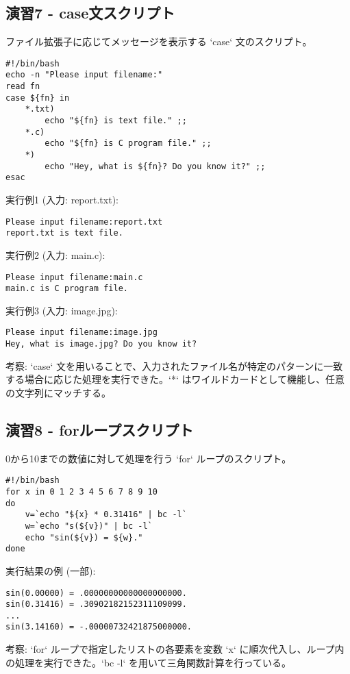\documentclass[a4paper,11pt]{jsarticle}
\begin{document}
\subsection*{演習7 - case文スクリプト}
ファイル拡張子に応じてメッセージを表示する `case` 文のスクリプト。
\begin{lstlisting}[caption=演習7 case文のスクリプト例 (PDF記載例)]
#!/bin/bash
echo -n "Please input filename:"
read fn
case ${fn} in
    *.txt)
        echo "${fn} is text file." ;;
    *.c)
        echo "${fn} is C program file." ;;
    *)
        echo "Hey, what is ${fn}? Do you know it?" ;;
esac
\end{lstlisting}
実行例1 (入力: report.txt):
\begin{verbatim}
Please input filename:report.txt
report.txt is text file.
\end{verbatim}
実行例2 (入力: main.c):
\begin{verbatim}
Please input filename:main.c
main.c is C program file.
\end{verbatim}
実行例3 (入力: image.jpg):
\begin{verbatim}
Please input filename:image.jpg
Hey, what is image.jpg? Do you know it?
\end{verbatim}
考察: `case` 文を用いることで、入力されたファイル名が特定のパターンに一致する場合に応じた処理を実行できた。`*` はワイルドカードとして機能し、任意の文字列にマッチする。

\subsection*{演習8 - forループスクリプト}
0から10までの数値に対して処理を行う `for` ループのスクリプト。
\begin{lstlisting}[caption=演習8 forループのスクリプト例 (PDF記載例)]
#!/bin/bash
for x in 0 1 2 3 4 5 6 7 8 9 10
do
    v=`echo "${x} * 0.31416" | bc -l`
    w=`echo "s(${v})" | bc -l`
    echo "sin(${v}) = ${w}."
done
\end{lstlisting}
実行結果の例 (一部):
\begin{verbatim}
sin(0.00000) = .00000000000000000000.
sin(0.31416) = .30902182152311109099.
...
sin(3.14160) = -.00000732421875000000.
\end{verbatim}
考察: `for` ループで指定したリストの各要素を変数 `x` に順次代入し、ループ内の処理を実行できた。`bc -l` を用いて三角関数計算を行っている。
\end{document}
